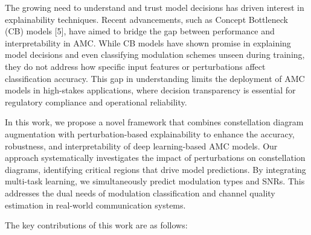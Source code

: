 \documentclass{ELSP}
\begin{document}
The growing need to understand and trust model decisions has driven interest in explainability techniques. Recent advancements, such as Concept Bottleneck (CB) models [5], have aimed to bridge the gap between performance and interpretability in AMC. While CB models have shown promise in explaining model decisions and even classifying modulation schemes unseen during training, they do not address how specific input features or perturbations affect classification accuracy. This gap in understanding limits the deployment of AMC models in high-stakes applications, where decision transparency is essential for regulatory compliance and operational reliability.

In this work, we propose a novel framework that combines constellation diagram augmentation with perturbation-based explainability to enhance the accuracy, robustness, and interpretability of deep learning-based AMC models. Our approach systematically investigates the impact of perturbations on constellation diagrams, identifying critical regions that drive model predictions. By integrating multi-task learning, we simultaneously predict modulation types and SNRs. This addresses the dual needs of modulation classification and channel quality estimation in real-world communication systems.

The key contributions of this work are as follows:
\end{document}

